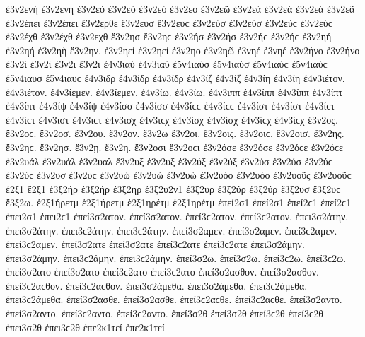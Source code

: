 {ἐ3ν2ενή ἐ3ν2ενή   %
ἐ3ν2εό ἐ3ν2εό   %
ἐ3ν2εὸ
ἐ3ν2εο
ἐ3ν2εῶ
ἐ3ν2εά ἐ3ν2εά
ἐ3ν2εὰ
ἐ3ν2εᾶ
ἐ3ν2έπει ἐ3ν2έπει
ἔ3ν2ερθε   %
ἔ3ν2ευσ ἔ3ν2ευϲ   %
ἐ3ν2εύσ ἐ3ν2εύσ ἐ3ν2εύϲ ἐ3ν2εύϲ   %
ἐ3ν2έχθ ἐ3ν2έχθ   %
ἐ3ν2εχθ
ἔ3ν2ησ ἔ3ν2ηϲ   %
ἐ3ν2ήσ ἐ3ν2ήσ ἐ3ν2ήϲ ἐ3ν2ήϲ
ἐ3ν2ηή ἐ3ν2ηή   %
ἐ3ν2ηὴ
ἔ3ν2ην.   %
ἐ3ν2ηεί ἐ3ν2ηεί   %
ἐ3ν2ηο
ἐ3ν2ηῶ
ἐ3νηέ ἐ3νηέ
ἐ3ν2ήνο ἐ3ν2ήνο   %
ἐ3ν2ί ἐ3ν2ί
ἐ3ν2ι
ἔ3ν2ι
ἐ4ν3ιαύ ἐ4ν3ιαύ   %
ἐ5ν4ιαύσ ἐ5ν4ιαύσ ἐ5ν4ιαύϲ ἐ5ν4ιαύϲ   %
ἐ5ν4ιαυσ ἐ5ν4ιαυϲ
ἐ4ν3ιδρ   %
ἐ4ν3ίδρ ἐ4ν3ίδρ   %
ἐ4ν3ίζ ἐ4ν3ίζ   %
ἐ4ν3ίη ἐ4ν3ίη   %
ἐ4ν3ιέτον. ἐ4ν3ιέτον.
ἐ4ν3ίεμεν. ἐ4ν3ίεμεν.
ἐ4ν3ίω. ἐ4ν3ίω.
ἐ4ν3ιππ   %
ἐ4ν3ίππ ἐ4ν3ίππ   %
ἐ4ν3ίπτ ἐ4ν3ίπτ   %
ἐ4ν3ίψ ἐ4ν3ίψ
ἐ4ν3ίσσ ἐ4ν3ίσσ ἐ4ν3ίϲϲ ἐ4ν3ίϲϲ   %
ἐ4ν3ίστ ἐ4ν3ίστ ἐ4ν3ίϲτ ἐ4ν3ίϲτ   %
ἐ4ν3ιστ ἐ4ν3ιϲτ
ἐ4ν3ισχ ἐ4ν3ιϲχ   %
ἐ4ν3ίσχ ἐ4ν3ίσχ ἐ4ν3ίϲχ ἐ4ν3ίϲχ   %
ἔ3ν2ος. ἔ3ν2οϲ.   %
ἔ3ν2οσ.
ἔ3ν2ου.
ἔ3ν2ον.
ἔ3ν2ω
ἔ3ν2οι.
ἔ3ν2οις. ἔ3ν2οιϲ.
ἔ3ν2οισ.
ἔ3ν2ης. ἔ3ν2ηϲ.
ἔ3ν2ησ.
ἔ3ν2ῃ.
ἔ3ν2η.
ἔ3ν2οσι ἔ3ν2οϲι   %
ἐ3ν2όσε ἐ3ν2όσε ἐ3ν2όϲε ἐ3ν2όϲε
ἐ3ν2υάλ ἐ3ν2υάλ   %
ἐ3ν2υαλ
ἔ3ν2υξ   %
ἐ3ν2υξ   %
ἐ3ν2ύξ ἐ3ν2ύξ   %
ἐ3ν2ύσ ἐ3ν2ύσ ἐ3ν2ύϲ ἐ3ν2ύϲ   %
ἐ3ν2υσ ἐ3ν2υϲ
ἐ3ν2υώ ἐ3ν2υώ   %
ἐ3ν2υὼ
ἐ3ν2υόο ἐ3ν2υόο
ἐ3ν2υοῦς ἐ3ν2υοῦϲ
ἐ2ξ1
ἔ2ξ1
ἐ3ξ2ήρ ἐ3ξ2ήρ   %
ἐ3ξ2ηρ   %
ἐ3ξ2υ2ν1   %
ἐ3ξ2υρ   %
ἐ3ξ2ύρ ἐ3ξ2ύρ   %
ἔ3ξ2υσ ἔ3ξ2υϲ   %
ἔ3ξ2ω.
ἑ2ξ1ήρετμ ἑ2ξ1ήρετμ   %
ἑ2ξ1ηρέτμ ἑ2ξ1ηρέτμ
ἐπεί2σ1 ἐπεί2σ1 ἐπεί2ϲ1 ἐπεί2ϲ1   %
ἐπει2σ1 ἐπει2ϲ1
ἐπεί3σ2ατον. ἐπεί3σ2ατον. ἐπεί3ϲ2ατον. ἐπεί3ϲ2ατον.   %
ἐπει3σ2άτην. ἐπει3σ2άτην. ἐπει3ϲ2άτην. ἐπει3ϲ2άτην.
ἐπεί3σ2αμεν. ἐπεί3σ2αμεν. ἐπεί3ϲ2αμεν. ἐπεί3ϲ2αμεν.
ἐπεί3σ2ατε ἐπεί3σ2ατε ἐπεί3ϲ2ατε ἐπεί3ϲ2ατε
ἐπει3σ2άμην. ἐπει3σ2άμην. ἐπει3ϲ2άμην. ἐπει3ϲ2άμην.
ἐπεί3σ2ω. ἐπεί3σ2ω. ἐπεί3ϲ2ω. ἐπεί3ϲ2ω.
ἐπεί3σ2ατο ἐπεί3σ2ατο ἐπεί3ϲ2ατο ἐπεί3ϲ2ατο
ἐπεί3σ2ασθον. ἐπεί3σ2ασθον. ἐπεί3ϲ2αϲθον. ἐπεί3ϲ2αϲθον.
ἐπει3σ2άμεθα. ἐπει3σ2άμεθα. ἐπει3ϲ2άμεθα. ἐπει3ϲ2άμεθα.
ἐπεί3σ2ασθε. ἐπεί3σ2ασθε. ἐπεί3ϲ2αϲθε. ἐπεί3ϲ2αϲθε.
ἐπεί3σ2αντο. ἐπεί3σ2αντο. ἐπεί3ϲ2αντο. ἐπεί3ϲ2αντο.
ἐπεί3σ2θ ἐπεί3σ2θ ἐπεί3ϲ2θ ἐπεί3ϲ2θ   %
ἐπει3σ2θ ἐπει3ϲ2θ
ἐπε2κ1τεί ἐπε2κ1τεί   %
}
